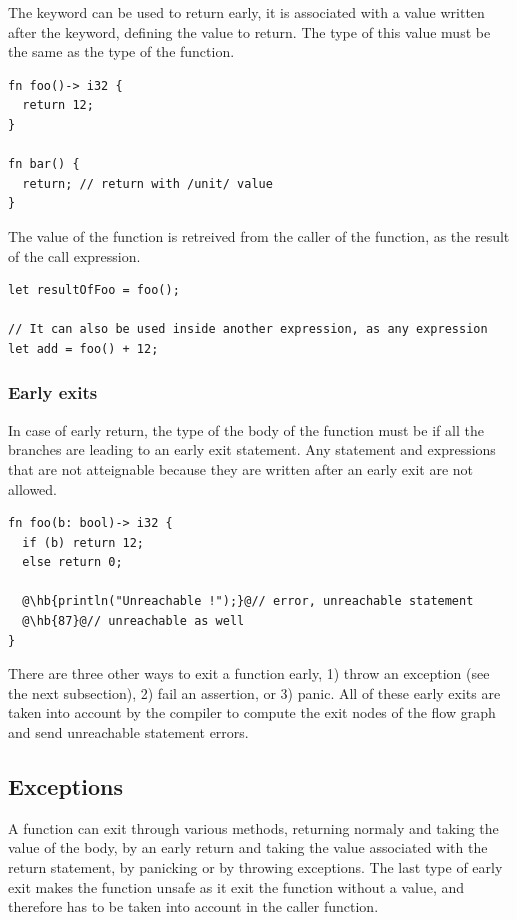 The keyword  can be used to return early, it is associated with a
value written after the keyword, defining the value to return. The type of this
value must be the same as the type of the function.

\begin{lstlisting}[style=coloredverbatim]
fn foo()-> i32 {
  return 12;
}

fn bar() {
  return; // return with /unit/ value
}
\end{lstlisting}

The value of the function is retreived from the caller of the function, as the
result of the call expression.

\begin{lstlisting}[style=coloredverbatim]
let resultOfFoo = foo();

// It can also be used inside another expression, as any expression
let add = foo() + 12;
\end{lstlisting}

\subsubsection*{Early exits}
\label{sec:function_early_return}

In case of early return, the type of the body of the function must be
 if all the branches are leading to an early exit statement. Any
statement and expressions that are not atteignable because they are written
after an early exit are not allowed.

\begin{lstlisting}[style=coloredverbatimError, escapechar=@]
fn foo(b: bool)-> i32 {
  if (b) return 12;
  else return 0;

  @\hb{println("Unreachable !");}@// error, unreachable statement
  @\hb{87}@// unreachable as well
}
\end{lstlisting}

There are three other ways to exit a function early, 1) throw an exception (see
the next subsection), 2) fail an assertion, or 3) panic. All of these early
exits are taken into account by the compiler to compute the exit nodes of the
flow graph and send unreachable statement errors.

\subsection {Exceptions}

A function can exit through various methods, returning normaly and taking the
value of the body, by an early return and taking the value associated with the
return statement, by panicking or by throwing exceptions. The last type of early
exit makes the function unsafe as it exit the function without a value, and
therefore has to be taken into account in the caller function.

